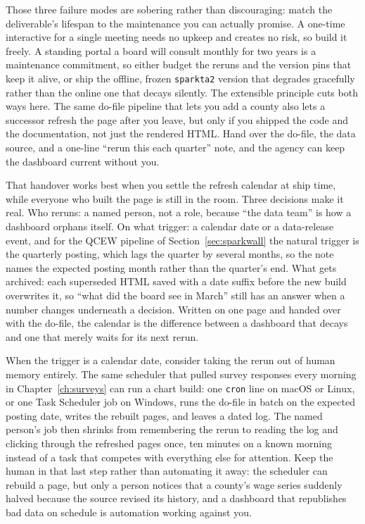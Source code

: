 Those three failure modes are sobering rather than discouraging: match the deliverable's lifespan to the maintenance you can actually promise. A one-time interactive for a single meeting needs no upkeep and creates no risk, so build it freely. A standing portal a board will consult monthly for two years is a maintenance commitment, so either budget the reruns and the version pins that keep it alive, or ship the offline, frozen \texttt{sparkta2} version that degrades gracefully rather than the online one that decays silently. The extensible principle cuts both ways here. The same do-file pipeline that lets you add a county also lets a successor refresh the page after you leave, but only if you shipped the code and the documentation, not just the rendered HTML. Hand over the do-file, the data source, and a one-line \enquote{rerun this each quarter} note, and the agency can keep the dashboard current without you.

That handover works best when you settle the refresh calendar at ship time, while everyone who built the page is still in the room. Three decisions make it real. Who reruns: a named person, not a role, because \enquote{the data team} is how a dashboard orphans itself. On what trigger: a calendar date or a data-release event, and for the QCEW pipeline of Section~\ref{sec:sparkwall} the natural trigger is the quarterly posting, which lags the quarter by several months, so the note names the expected posting month rather than the quarter's end. What gets archived: each superseded HTML saved with a date suffix before the new build overwrites it, so \enquote{what did the board see in March} still has an answer when a number changes underneath a decision. Written on one page and handed over with the do-file, the calendar is the difference between a dashboard that decays and one that merely waits for its next rerun.

When the trigger is a calendar date, consider taking the rerun out of human memory entirely. The same scheduler that pulled survey responses every morning in Chapter~\ref{ch:surveys} can run a chart build: one \texttt{cron} line on macOS or Linux, or one Task Scheduler job on Windows, runs the do-file in batch on the expected posting date, writes the rebuilt pages, and leaves a dated log. The named person's job then shrinks from remembering the rerun to reading the log and clicking through the refreshed pages once, ten minutes on a known morning instead of a task that competes with everything else for attention. Keep the human in that last step rather than automating it away: the scheduler can rebuild a page, but only a person notices that a county's wage series suddenly halved because the source revised its history, and a dashboard that republishes bad data on schedule is automation working against you.

